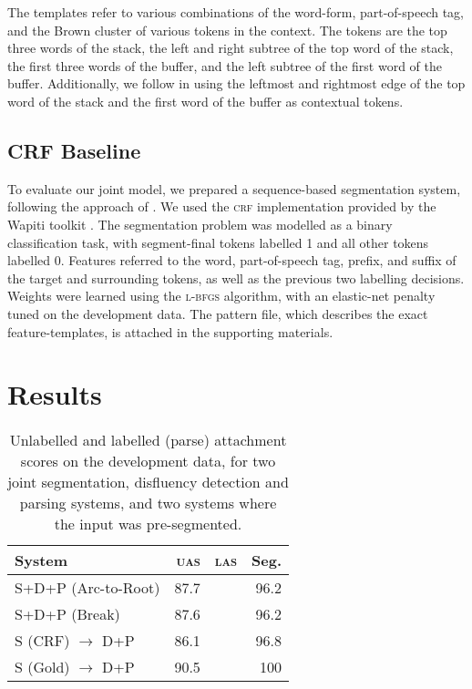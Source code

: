 \documentclass[11pt,letterpaper]{article}
\begin{document}
The templates refer to various combinations of the word-form, part-of-speech tag,
and the Brown cluster \citep{brown:92} of various tokens
in the context.  The tokens are the top three words of the stack, the left and
right subtree of the top word of the stack, the first three words of the buffer,
and the left subtree of the first word of the buffer.  Additionally, we follow
\citet{honnibal:14} in using the leftmost and rightmost edge of the top word
of the stack and the first word of the buffer as contextual tokens.


\subsection{CRF Baseline}
\label{sec:crf}

To evaluate our joint model, we prepared a sequence-based segmentation system,
following the approach of \citet{liu:05}.  We used the \textsc{crf} implementation
provided by the Wapiti toolkit \citep{wapiti}.
The segmentation problem was modelled as a binary classification task, with
segment-final tokens labelled 1 and all other tokens labelled 0.
Features referred to the word, part-of-speech tag, prefix, and suffix of the
target and surrounding tokens, as well as the previous two labelling decisions.
Weights were learned using the \textsc{l-bfgs} algorithm,
with an elastic-net penalty tuned on the development data.  The pattern file,
which describes the exact feature-templates, is attached in the supporting
materials.

\section{Results}
\label{sec:results}

\begin{table}
    \centering
    \small
    \begin{tabular}{l|rrr}
        System & \textsc{uas} & \textsc{las} & Seg. \\
        \hline \hline
        S+D+P (Arc-to-Root) & 87.7 & & 96.2 \\
        S+D+P (Break) & 87.6 & & 96.2 \\
        \hline
        S (CRF) $\rightarrow$ D+P & 86.1 & & 96.8 \\
        S (Gold) $\rightarrow$ D+P & 90.5 & & 100 \\
        \hline
    \end{tabular}
    \caption{\small Unlabelled and labelled (parse) attachment scores on the
        development data, for two joint segmentation, disfluency detection
        and parsing systems,
        and two systems where the input was pre-segmented.
        \label{tab:parse}}
\end{table}
\end{document}
